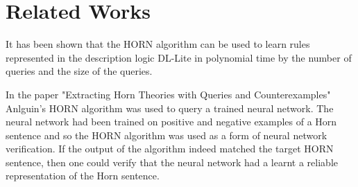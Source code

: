 \chapter{Related Works}
It has been shown that the HORN algorithm can be used to learn rules represented in the description logic DL-Lite in polynomial time by the number of queries and the size of the queries. \cite{DL_lite} 

In the paper "Extracting Horn Theories with Queries and Counterexamples"  Anlguin's HORN algorithm was used to query a trained neural network. The neural network had been trained on positive and negative examples of a Horn sentence and so the HORN algorithm was used as a form of neural network verification. If the output of the algorithm indeed matched the target HORN sentence, then one could verify that the neural network had a learnt a reliable representation of the Horn sentence.